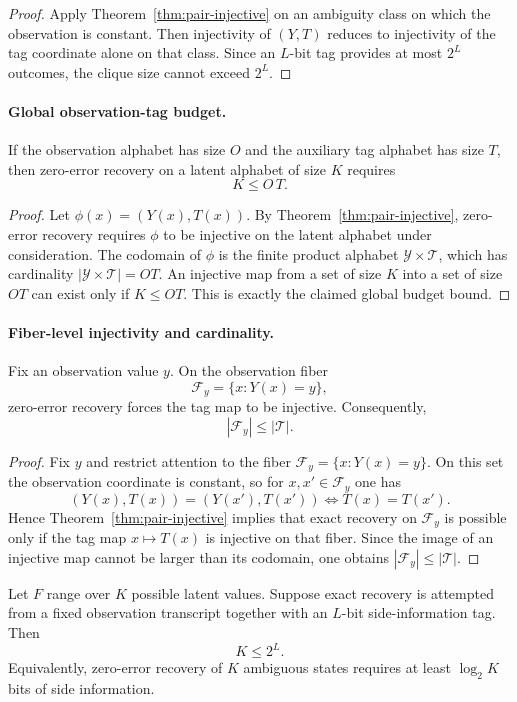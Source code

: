 \begin{proof}
Apply Theorem~\ref{thm:pair-injective} on an ambiguity class on which the observation is constant. Then injectivity of $(Y,T)$ reduces to injectivity of the tag coordinate alone on that class. Since an $L$-bit tag provides at most $2^L$ outcomes, the clique size cannot exceed $2^L$.
\end{proof}

\paragraph{Global observation-tag budget.}
If the observation alphabet has size $O$ and the auxiliary tag alphabet has size $T$, then zero-error recovery on a latent alphabet of size $K$ requires
\[
K \le O\,T.
\] 

\begin{proof}
Let $\phi(x)=(Y(x),T(x))$. By Theorem~\ref{thm:pair-injective}, zero-error recovery requires $\phi$ to be injective on the latent alphabet under consideration. The codomain of $\phi$ is the finite product alphabet $\mathcal Y\times\mathcal T$, which has cardinality $|\mathcal Y\times\mathcal T|=OT$. An injective map from a set of size $K$ into a set of size $OT$ can exist only if $K\le OT$. This is exactly the claimed global budget bound.
\end{proof}

\paragraph{Fiber-level injectivity and cardinality.}
Fix an observation value $y$. On the observation fiber
\[
\mathcal F_y=\{x : Y(x)=y\},
\]
zero-error recovery forces the tag map to be injective. Consequently,
\[
|\mathcal F_y| \le |\mathcal T|.
\] 

\begin{proof}
Fix $y$ and restrict attention to the fiber $\mathcal F_y=\{x:Y(x)=y\}$. On this set the observation coordinate is constant, so for $x,x'\in\mathcal F_y$ one has
\[
(Y(x),T(x))=(Y(x'),T(x')) \iff T(x)=T(x').
\]
Hence Theorem~\ref{thm:pair-injective} implies that exact recovery on $\mathcal F_y$ is possible only if the tag map $x\mapsto T(x)$ is injective on that fiber. Since the image of an injective map cannot be larger than its codomain, one obtains $|\mathcal F_y|\le |\mathcal T|$.
\end{proof}

\begin{theorem}\label{thm:fano-converse}
Let $F$ range over $K$ possible latent values. Suppose exact recovery is attempted from a fixed observation transcript together with an $L$-bit side-information tag. Then
\[
K \le 2^L.
\]
Equivalently, zero-error recovery of $K$ ambiguous states requires at least $\log_2 K$ bits of side information.
\end{theorem}

